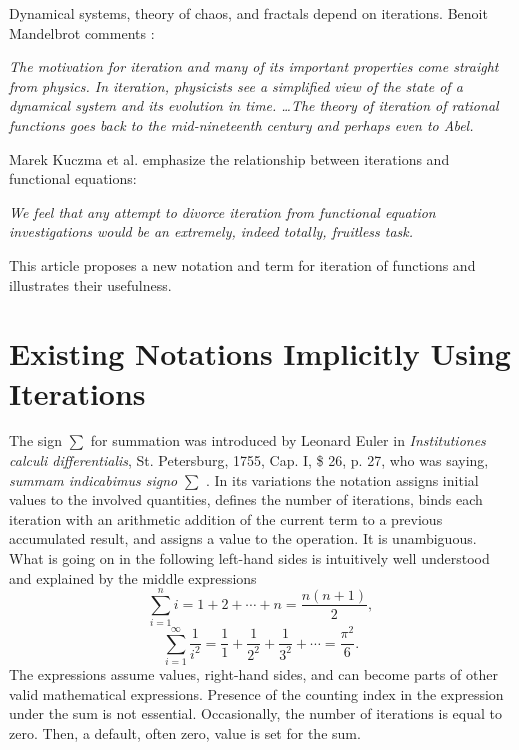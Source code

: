 \documentclass{article}
\begin{document}
Dynamical systems, theory of chaos, and fractals depend on iterations. Benoit Mandelbrot comments \cite[p. 260, p. 268]{mandelbrot}:

\textit{The motivation for iteration and many of its important properties come straight from physics. In iteration, physicists see a simplified view of the state of a dynamical system and its evolution in time. \ldots The theory of iteration of rational functions goes back to the mid-nineteenth century and perhaps even to Abel.}

Marek Kuczma et al. \cite[p. 13]{kuczma} emphasize the relationship between iterations and functional equations:

\textit{We feel that any attempt to divorce iteration from functional equation investigations would be an extremely, indeed totally, fruitless task.}

This article proposes a new notation and term for iteration of functions and illustrates their usefulness.

\section{Existing Notations Implicitly Using Iterations}

The sign $\sum$ for summation was introduced by Leonard Euler in \textit{Institutiones calculi differentialis}, St. Petersburg, 1755, Cap. I, \$ 26, p. 27, who was saying, \textit {summam indicabimus signo} $\sum$ \cite[item 438, p. 61]{cajori}. In its variations the notation assigns initial values to the involved quantities, defines the number of iterations, binds each iteration with an arithmetic addition of the current term to a previous accumulated result, and assigns a value to the operation. It is unambiguous. What is going on in the following left-hand sides is intuitively well understood and explained by the middle expressions
\begin{displaymath}
\sum_{i=1}^{n} i = 1 + 2 + \cdots + n = \frac{n(n + 1)}{2},
\end{displaymath}
\begin{displaymath}
\sum_{i=1}^{\infty} \frac{1}{i^2} = \frac{1}{1} + \frac{1}{2^2} + \frac{1}{3^2} + \cdots = \frac{\pi^2}{6}.
\end{displaymath}
The expressions assume values, right-hand sides, and can become parts of other valid mathematical expressions. Presence of the counting index in the expression under the sum is not essential. Occasionally, the number of iterations is equal to zero. Then, a default, often zero, value is set for the sum.
\end{document}
